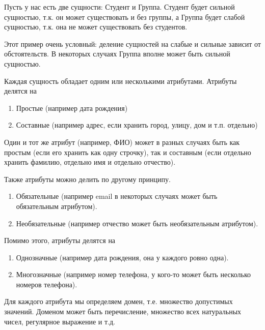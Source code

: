 \begin{example}
  Пусть у нас есть две сущности: Студент и Группа. Студент будет сильной
  сущностью, т.к. он может существовать и без группы, а Группа будет слабой
  сущностью, т.к. она не может существовать без студентов.

  Этот пример очень условный: деление сущностей на слабые и сильные зависит от
  обстоятельств. В некоторых случаях Группа вполне может быть сильной сущностью.
\end{example}

Каждая сущность обладает одним или несколькими атрибутами. Атрибуты делятся на

\begin{enumerate}
\item
  Простые (например дата рождения)

\item
  Составные (например адрес, если хранить город, улицу, дом и т.п. отдельно)
\end{enumerate}

\begin{remark}
  Один и тот же атрибут (например, ФИО) может в разных случаях быть как простым
  (если его хранить как одну строчку), так и составным (если отдельно хранить
  фамилию, отдельно имя и отдельно отчество).
\end{remark}

Также атрибуты можно делить по другому принципу.

\begin{enumerate}
\item
  Обязательные (например email в некоторых случаях может быть обязательным
  атрибутом).

\item
  Необязательные (например отчество может быть необязательным атрибутом).
\end{enumerate}

Помимо этого, атрибуты делятся на

\begin{enumerate}
\item
  Однозначные (например дата рождения, она у каждого ровно одна).

\item
  Многозначные (например номер телефона, у кого-то может быть несколько номеров
  телефона).
\end{enumerate}

Для каждого атрибута мы определяем домен, т.е. множество допустимых значений.
Доменом может быть перечисление, множество всех натуральных чисел, регулярное
выражение и т.д.

